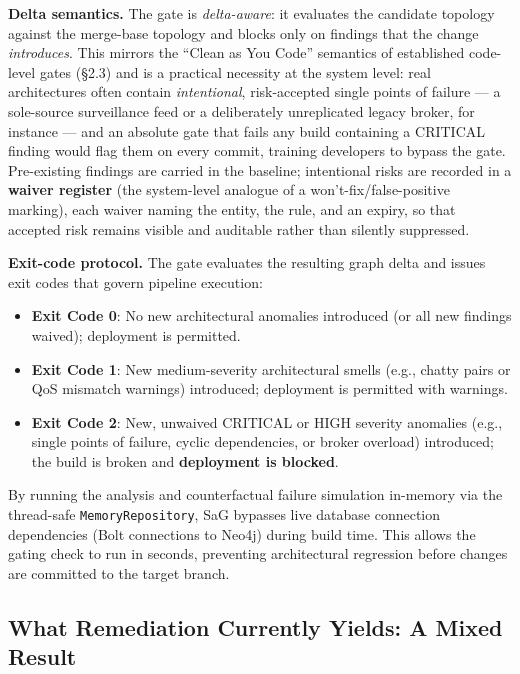 \documentclass[review]{elsarticle}
\begin{document}
\textbf{Delta semantics.} The gate is \emph{delta-aware}: it evaluates the candidate topology
against the merge-base topology and blocks only on findings that the change \emph{introduces}. This
mirrors the ``Clean as You Code'' semantics of established code-level gates (\S2.3) and is a
practical necessity at the system level: real architectures often contain \emph{intentional},
risk-accepted single points of failure --- a sole-source surveillance feed or a deliberately
unreplicated legacy broker, for instance --- and an absolute gate that fails any build containing a
CRITICAL finding would flag them on every commit, training developers to bypass the gate.
Pre-existing findings are carried in the baseline; intentional risks are recorded in a \textbf{waiver
register} (the system-level analogue of a won't-fix/false-positive marking), each waiver naming the
entity, the rule, and an expiry, so that accepted risk remains visible and auditable rather than
silently suppressed.

\textbf{Exit-code protocol.} The gate evaluates the resulting graph delta and issues exit codes that
govern pipeline execution:
\begin{itemize}
\item \textbf{Exit Code 0}: No new architectural anomalies introduced (or all new findings waived);
  deployment is permitted.
\item \textbf{Exit Code 1}: New medium-severity architectural smells (e.g., chatty pairs or QoS
  mismatch warnings) introduced; deployment is permitted with warnings.
\item \textbf{Exit Code 2}: New, unwaived CRITICAL or HIGH severity anomalies (e.g., single points
  of failure, cyclic dependencies, or broker overload) introduced; the build is broken and
  \textbf{deployment is blocked}.
\end{itemize}

By running the analysis and counterfactual failure simulation in-memory via the thread-safe
\texttt{MemoryRepository}, SaG bypasses live database connection dependencies (Bolt connections to
Neo4j) during build time. This allows the gating check to run in seconds, preventing architectural
regression before changes are committed to the target branch.

\subsection{What Remediation Currently Yields: A Mixed Result}
\label{sec:mixed-result}
\end{document}
